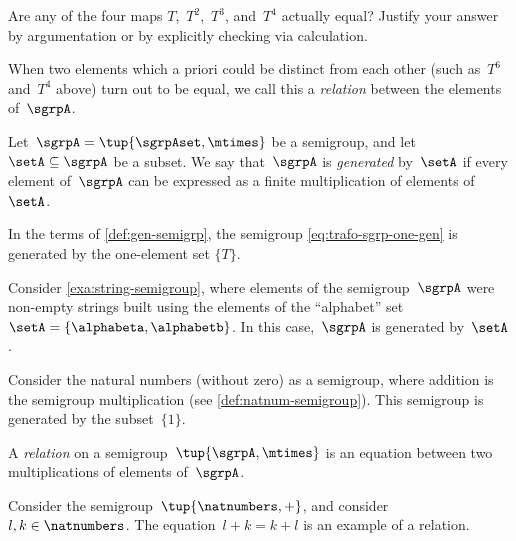 \begin{gradedexercise}
  Are any of the four maps $T$,~$T^2$,~$T^3$, and~$T^4$ actually equal? Justify your answer by argumentation or by explicitly checking via calculation.
\end{gradedexercise}

When two elements which a priori could be distinct from each other (such as~$T^6$ and~$T^4$ above) turn out to be equal, we call this a \emph{relation} between the elements of~$\sgrpA$.

\begin{definition}
  \label{def:gen-semigrp}
  Let~$\sgrpA = \tup{\sgrpAset, \mtimes}$ be a semigroup, and let~$\setA \subseteq \sgrpA$ be a subset.
  We say that~$\sgrpA$ is \emph{generated} by~$\setA$ if every element of~$\sgrpA$ can be expressed as a finite multiplication of elements of~$\setA$.
\end{definition}

\begin{remark}
  In the terms of \cref{def:gen-semigrp}, the semigroup \cref{eq:trafo-sgrp-one-gen} is generated by the one-element set $\{ T \}$.
\end{remark}

\begin{example}
  Consider \cref{exa:string-semigroup}, where elements of the semigroup~$\sgrpA$ were non-empty strings built using the elements of the ``alphabet'' set~$\setA = \{ \alphabeta, \alphabetb\}$.
  In this case,~$\sgrpA$ is generated by~$\setA$.
\end{example}


\begin{example}
  Consider the natural numbers (without zero) as a semigroup, where addition is the semigroup multiplication (see \cref{def:natnum-semigroup}). This semigroup is generated by the subset~$\{1 \}$.
\end{example}

\begin{definition}
  A \emph{relation} on a semigroup~$\tup{\sgrpA, \mtimes}$ is an equation between two multiplications of elements of~$\sgrpA$.
\end{definition}

\begin{example}
  Consider the semigroup~$\tup{\natnumbers, +}$, and consider~$l, k \in \natnumbers$. The equation~$l + k = k + l$ is an example of a relation.
\end{example}

